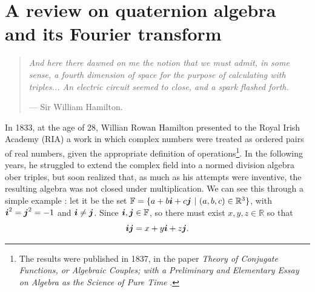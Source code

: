 


\chapter{A review on quaternion algebra and its Fourier transform}
\label{ch:reviewQuat}

\begin{quotation}
\itshape
And here there dawned on me the notion that we must admit, in some sense, a fourth dimension of space for the purpose of calculating with triples... An electric circuit seemed to close, and a spark flashed forth.

\noindent --- Sir William Hamilton.
\end{quotation}


In 1833, at the age of 28, Willian Rowan Hamilton presented to the Royal Irish Academy (RIA) a work in which complex numbers were treated as ordered pairs of real numbers, given the appropriate definition of operations\footnote{The results were published in 1837, in the paper \emph{Theory of Conjugate Functions, or Algebraic Couples; with a Preliminary and Elementary Essay on Algebra as the Science of Pure Time} \cite{hamilton1837theory}.}. In the following years, he struggled to extend the complex field into a normed division algebra ober triples, but soon realized that, as much as his attempts were inventive, the resulting algebra was not closed under multiplication. We can see this through a simple example \cite{santos2011algebra}: let it be the set $\mathbb{F} = \{ a + b \boldsymbol{i} + c \boldsymbol{j}  \ | \ (a, b, c) \in \mathbb{R}^3\}$, with $\boldsymbol{i}^2 = \boldsymbol{j}^2 = -1$ and $\boldsymbol{i} \neq \boldsymbol{j}$. Since $\boldsymbol{i}, \boldsymbol{j} \in \mathbb{F}$, so there must exist $x, y, z \in \mathbb{R}$ so that
\begin{equation}
\boldsymbol{i} \boldsymbol{j} = x + y \boldsymbol{i} + z \boldsymbol{j}.
\label{eq:demonstration01}
\end{equation}

